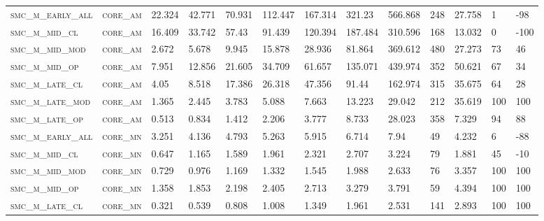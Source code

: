 \begin{landscape}
\begin{center}
\begin{footnotesize}
\begin{longtable}{lllllllllllll}
\textsc{smc\_m\_early\_all} & \textsc{core\_am  }   & 22.324   & 42.771   & 70.931   & 112.447  & 167.314  & 321.23   & 566.868  & 248    & 27.758        & 1             & -98      \\
\textsc{smc\_m\_mid\_cl   } & \textsc{core\_am  }   & 16.409   & 33.742   & 57.43    & 91.439   & 120.394  & 187.484  & 310.596  & 168    & 13.032        & 0             & -100     \\
\textsc{smc\_m\_mid\_mod  } & \textsc{core\_am  }   & 2.672    & 5.678    & 9.945    & 15.878   & 28.936   & 81.864   & 369.612  & 480    & 27.273        & 73            & 46       \\
\textsc{smc\_m\_mid\_op   } & \textsc{core\_am  }   & 7.951    & 12.856   & 21.605   & 34.709   & 61.657   & 135.071  & 439.974  & 352    & 50.621        & 67            & 34       \\
\textsc{smc\_m\_late\_cl  } & \textsc{core\_am  }   & 4.05     & 8.518    & 17.386   & 26.318   & 47.356   & 91.44    & 162.974  & 315    & 35.675        & 64            & 28       \\
\textsc{smc\_m\_late\_mod } & \textsc{core\_am  }   & 1.365    & 2.445    & 3.783    & 5.088    & 7.663    & 13.223   & 29.042   & 212    & 35.619        & 100           & 100      \\
\textsc{smc\_m\_late\_op  } & \textsc{core\_am  }   & 0.513    & 0.834    & 1.412    & 2.206    & 3.777    & 8.733    & 28.023   & 358    & 7.329         & 94            & 88       \\
\textsc{smc\_m\_early\_all} & \textsc{core\_mn  }   & 3.251    & 4.136    & 4.793    & 5.263    & 5.915    & 6.714    & 7.94     & 49     & 4.232         & 6             & -88      \\
\textsc{smc\_m\_mid\_cl   } & \textsc{core\_mn  }   & 0.647    & 1.165    & 1.589    & 1.961    & 2.321    & 2.707    & 3.224    & 79     & 1.881         & 45            & -10      \\
\textsc{smc\_m\_mid\_mod  } & \textsc{core\_mn  }   & 0.729    & 0.976    & 1.169    & 1.332    & 1.545    & 1.988    & 2.633    & 76     & 3.357         & 100           & 100      \\
\textsc{smc\_m\_mid\_op   } & \textsc{core\_mn  }   & 1.358    & 1.853    & 2.198    & 2.405    & 2.713    & 3.279    & 3.791    & 59     & 4.394         & 100           & 100      \\
\textsc{smc\_m\_late\_cl  } & \textsc{core\_mn  }   & 0.321    & 0.539    & 0.808    & 1.008    & 1.349    & 1.961    & 2.531    & 141    & 2.893         & 100           & 100      \\

\end{longtable}
\end{footnotesize}
\end{center}
\end{landscape}
